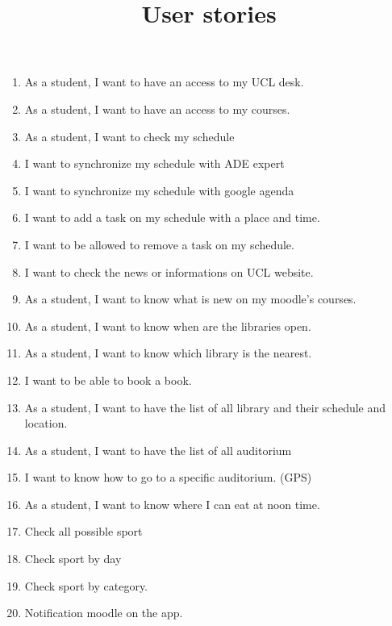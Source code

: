 \documentclass{article}
\title{User stories}
\begin{document}
\maketitle

\begin{enumerate}

\item As a student, I want to have an access to my UCL desk.

\item As a student, I want to have an access to my courses.

\item As a student, I want to check my schedule
\item I want to synchronize my schedule with ADE expert
\item I want to synchronize my schedule with google agenda
\item I want to add a task on my schedule with a place and time.
\item I want to be allowed to remove a task on my schedule.
\item I want to check the news or informations on UCL website. 

\item As a student, I want to know what is new on my moodle's courses.

\item As a student, I want to know when are the libraries open.
\item As a student, I want to know which library is the nearest.
\item I want to be able to book a book.
\item As a student, I want to have the list of all library and their schedule and location.
\item As a student, I want to have the list of all auditorium
\item I want to know how to go to a specific auditorium. (GPS)

\item As a student, I want to know where I can eat at noon time.
\item Check all possible sport
\item Check sport by day
\item Check sport by category.
\item Notification moodle on the app.


\end{enumerate}
\end{document}
